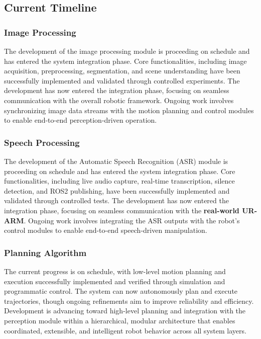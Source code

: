 \documentclass[12pt]{extarticle}
\begin{document}
\subsection{Current Timeline}

\subsubsection{Image Processing}

The development of the image processing module is proceeding on schedule and has entered the system integration phase. Core functionalities, including image acquisition, preprocessing, segmentation, and scene understanding have been successfully implemented and validated through controlled experiments. The development has now entered the integration phase, focusing on seamless communication with the overall robotic framework. Ongoing work involves synchronizing image data streams with the motion planning and control modules to enable end-to-end perception-driven operation.

\subsubsection{Speech Processing}

The development of the Automatic Speech Recognition (ASR) module is proceeding on schedule and has entered the system integration phase. Core functionalities, including live audio capture, real-time transcription, silence detection, and ROS2 publishing, have been successfully implemented and validated through controlled tests. The development has now entered the integration phase, focusing on seamless communication with the \textbf{real-world UR-ARM}. Ongoing work involves integrating the ASR outputs with the robot's control modules to enable end-to-end speech-driven manipulation.

\subsubsection{Planning Algorithm}
The current progress is on schedule, with low-level motion planning and execution successfully implemented and verified through simulation and programmatic control. The system can now autonomously plan and execute trajectories, though ongoing refinements aim to improve reliability and efficiency. Development is advancing toward high-level planning and integration with the perception module within a hierarchical, modular architecture that enables coordinated, extensible, and intelligent robot behavior across all system layers.
\end{document}
